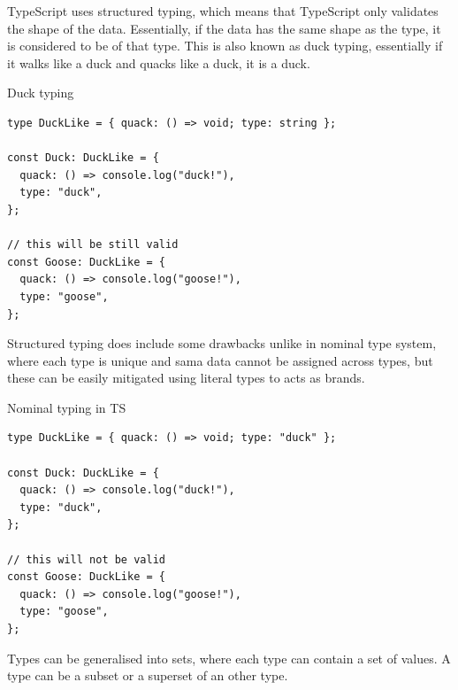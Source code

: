 TypeScript uses structured typing, which means that TypeScript only validates the shape of the data. Essentially, if the data has the same shape as the type, it is considered to be of that type. This is also known as duck typing, essentially if it walks like a duck and quacks like a duck, it is a duck.

\begin{listing}[h]
\caption{Duck typing}
\begin{verbatim}
type DuckLike = { quack: () => void; type: string };

const Duck: DuckLike = {
  quack: () => console.log("duck!"),
  type: "duck",
};

// this will be still valid
const Goose: DuckLike = {
  quack: () => console.log("goose!"),
  type: "goose",
};
\end{verbatim}
\end{listing}

Structured typing does include some drawbacks unlike in nominal type system, where each type is unique and sama data cannot be assigned across types, but these can be easily mitigated using literal types to acts as brands.

\begin{listing}[h]
\caption{Nominal typing in TS}
\begin{verbatim}
type DuckLike = { quack: () => void; type: "duck" };

const Duck: DuckLike = {
  quack: () => console.log("duck!"),
  type: "duck",
};

// this will not be valid
const Goose: DuckLike = {
  quack: () => console.log("goose!"),
  type: "goose",
};
\end{verbatim}
\end{listing}

Types can be generalised into sets, where each type can contain a set of values. A type can be a subset or a superset of an other type.

